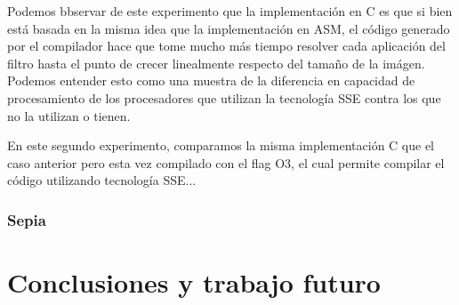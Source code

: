 \documentclass[a4paper]{article}
\newenvironment{codesnippet}{%
	\begin{Sbox}\begin{minipage}{\textwidth}\sffamily\small}%
	{\end{minipage}\end{Sbox}%
		\begin{center}%
		\vspace{-0.4cm}\colorbox{litegrey}{\TheSbox}\end{center}\vspace{0.3cm}}
\begin{document}
Podemos bbservar de este experimento que la implementación en C es que si bien está basada en la misma idea que la implementación en ASM,
el código generado por el compilador hace que tome mucho más tiempo resolver cada aplicación del filtro hasta el punto de crecer linealmente
respecto del tamaño de la imágen. Podemos entender esto como una muestra de la diferencia en capacidad de procesamiento de los procesadores que utilizan
la tecnología SSE contra los que no la utilizan o tienen.

\begin{figure}[!ht]
    \centering
    \begin{floatrow}
    \end{floatrow}
\end{figure}

En este segundo experimento, comparamos la misma implementación C que el caso anterior pero esta vez compilado con el flag O3, 
el cual permite compilar el código utilizando tecnología SSE...

\subsubsection{Sepia}


\section{Conclusiones y trabajo futuro}










\end{document}
